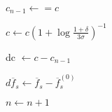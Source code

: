 \begin{algorithm}
{    $c_{n-1} \longleftarrow = c$ \;

    $
    c \longleftarrow c\left(1 + \log\frac{1 + \delta}{3 \sigma}\right)^{-1}
    $

    dc $\longleftarrow c - c_{n-1}$ \;

     {
        $d\overline{f}_s \longleftarrow \overline{f}_s - \overline{f}_s^{(0)}$ \;

        \vspace{5pt}

        {
        }
        
        \vspace{5pt}
    }

    $n \longleftarrow n+1 $ \;

}

\end{algorithm}
